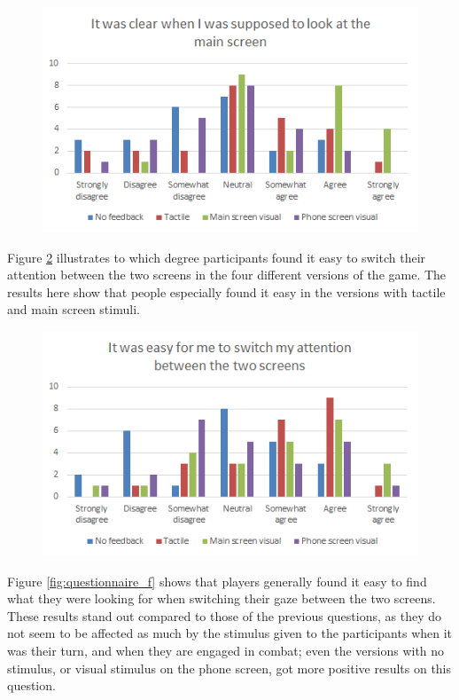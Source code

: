 \begin{figure}[h!]
	\centering
	\includegraphics[scale=1]{figures/questionnaire_d.png}
	\caption{}\label{fig:questionnaire_d}
\end{figure}

Figure \ref{fig:questionnaire_e} illustrates to which degree participants found it easy to switch their attention between the two screens in the four different versions of the game. The results here show that people especially found it easy in the versions with tactile and main screen stimuli.

\begin{figure}[h!]
	\centering
	\includegraphics[scale=1]{figures/questionnaire_e.png}
	\caption{}\label{fig:questionnaire_e}
\end{figure}

Figure \ref{fig:questionnaire_f} shows that players generally found it easy to find what they were looking for when switching their gaze between the two screens. These results stand out compared to those of the previous questions, as they do not seem to be affected as much by the stimulus given to the participants when it was their turn, and when they are engaged in combat; even the versions with no stimulus, or visual stimulus on the phone screen, got more positive results on this question.

